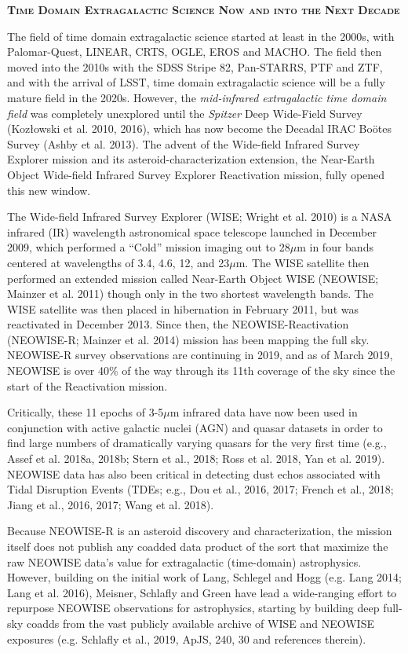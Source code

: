 \documentclass[12pt]{article}
\begin{document}
\pagebreak
\smallskip
\smallskip
\noindent
{\bfseries \textsc{\textcolor{Cerulean}{Time Domain Extragalactic Science Now and into the Next Decade}}}

\smallskip
\smallskip 
\noindent
The field of time domain extragalactic science started at least in the 2000s, with Palomar-Quest, LINEAR, CRTS, OGLE, EROS and MACHO. The field then moved into the 2010s with the SDSS Stripe 82, Pan-STARRS, PTF and ZTF, and with the arrival of LSST, time domain extragalactic science will be a fully mature field in the 2020s. However, the {\it mid-infrared extragalactic time domain field} was completely unexplored until the {\it Spitzer} Deep Wide-Field Survey (Koz{\l}owski et al. 2010, 2016), which has now become the Decadal IRAC Bo\"{o}tes Survey (Ashby et al. 2013). The advent of the Wide-field Infrared Survey Explorer mission and its asteroid-characterization extension, the Near-Earth Object Wide-field Infrared Survey Explorer Reactivation mission, fully opened this new window.

\smallskip 
\smallskip 
\noindent
The Wide-field Infrared Survey Explorer (WISE; Wright et al. 2010) is
a NASA infrared (IR) wavelength astronomical space telescope launched
in December 2009, which performed a ``Cold'' mission imaging out to
28$\mu$m in four bands centered at wavelengths of 3.4, 4.6, 12, and
23$\mu$m. The WISE satellite then performed an extended mission called
Near-Earth Object WISE (NEOWISE; Mainzer et al. 2011) though only in
the two shortest wavelength bands. The WISE satellite was then placed in
hibernation in February 2011, but was reactivated in December 2013.
Since then, the NEOWISE-Reactivation (NEOWISE-R; Mainzer et al. 2014)
mission has been mapping the full sky. NEOWISE-R survey observations
are continuing in 2019, and as of March 2019, NEOWISE is over 40\%
of the way through its 11th coverage of the sky since the start of the
Reactivation mission.

\smallskip
\smallskip 
\noindent
Critically, these 11 epochs of 3-5$\mu$m infrared data have now been
used in conjunction with active galactic nuclei (AGN) and quasar
datasets in order to find large numbers of dramatically varying
quasars for the very first time (e.g., Assef et al. 2018a, 2018b; Stern
et al., 2018; Ross et al. 2018, Yan et al. 2019). NEOWISE data has
also been critical in detecting dust echos associated with Tidal
Disruption Events (TDEs; e.g., Dou et al., 2016, 2017; French et al., 2018;
Jiang et al., 2016, 2017; Wang et al. 2018). 

\smallskip
\smallskip
\noindent
Because NEOWISE-R is an asteroid discovery and characterization, the mission itself does not publish any coadded data product of the sort that maximize the raw NEOWISE data’s value for extragalactic (time-domain) astrophysics. However, building on the initial work of Lang, Schlegel and Hogg (e.g. Lang 2014; Lang et al. 2016), Meisner, Schlafly and Green have lead a wide-ranging effort to repurpose NEOWISE observations for astrophysics, starting by building deep full-sky coadds from the vast publicly available archive of WISE and NEOWISE exposures (e.g. Schlafly  et al., 2019, ApJS, 240, 30 and references therein).
\end{document}
